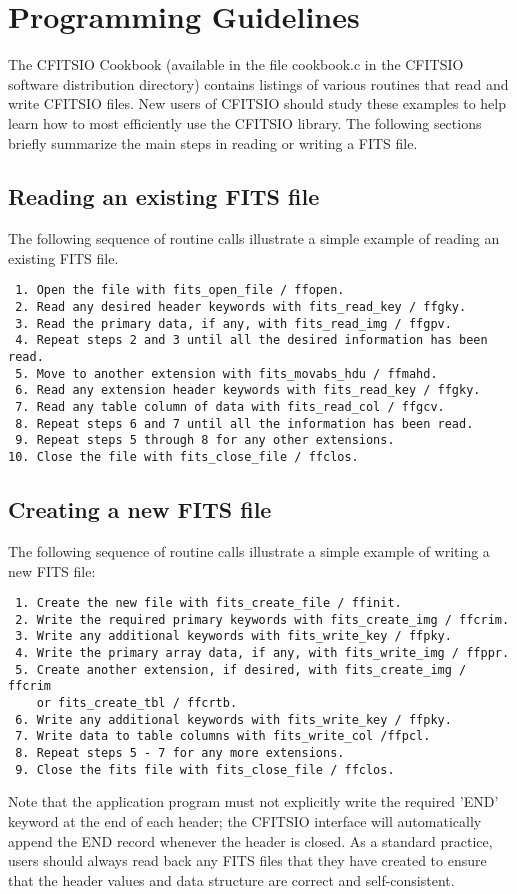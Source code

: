 
\chapter{ Programming Guidelines }

The CFITSIO Cookbook (available in the file cookbook.c in the CFITSIO
software distribution directory) contains listings of various
routines that read and write CFITSIO files.  New users of CFITSIO should
study these examples to help learn how to most efficiently use the
CFITSIO library.   The following sections briefly summarize the
main steps in reading or writing a FITS file.


\section{Reading an existing FITS file}

The following sequence of routine calls illustrate a simple example
of reading an existing FITS file.

\begin{verbatim}
 1. Open the file with fits_open_file / ffopen.
 2. Read any desired header keywords with fits_read_key / ffgky.
 3. Read the primary data, if any, with fits_read_img / ffgpv.
 4. Repeat steps 2 and 3 until all the desired information has been read.
 5. Move to another extension with fits_movabs_hdu / ffmahd.
 6. Read any extension header keywords with fits_read_key / ffgky.
 7. Read any table column of data with fits_read_col / ffgcv.
 8. Repeat steps 6 and 7 until all the information has been read.
 9. Repeat steps 5 through 8 for any other extensions.
10. Close the file with fits_close_file / ffclos.
\end{verbatim}


\section{Creating a new FITS file}

The following sequence of routine calls illustrate a simple example
of writing a new FITS file:

\begin{verbatim}
 1. Create the new file with fits_create_file / ffinit.
 2. Write the required primary keywords with fits_create_img / ffcrim.
 3. Write any additional keywords with fits_write_key / ffpky.
 4. Write the primary array data, if any, with fits_write_img / ffppr.
 5. Create another extension, if desired, with fits_create_img / ffcrim
    or fits_create_tbl / ffcrtb.
 6. Write any additional keywords with fits_write_key / ffpky.
 7. Write data to table columns with fits_write_col /ffpcl.
 8. Repeat steps 5 - 7 for any more extensions.
 9. Close the fits file with fits_close_file / ffclos.
\end{verbatim}
Note that the application program must not explicitly write the
required 'END' keyword at the end of each header;  the CFITSIO interface
will automatically append the END record whenever the header is closed.
As a standard practice, users should always read back any FITS files
that they have created to ensure that the header values and data structure
are correct and self-consistent.


